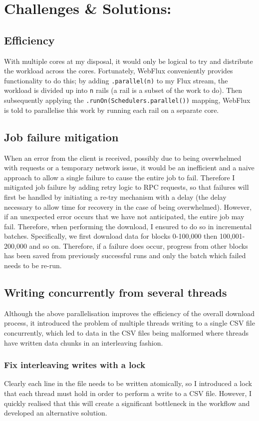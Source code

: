 \section{Challenges \& Solutions:}
\subsection{Efficiency}
With multiple cores at my disposal, it would only be logical to try and distribute the workload across the cores. Fortunately, WebFlux conveniently provides functionality to do this; by adding \texttt{.parallel(n)} to my Flux stream, the workload is divided up into \texttt{n} rails (a rail is a subset of the work to do). Then subsequently applying the \texttt{.runOn(Schedulers.parallel())} mapping, WebFlux is told to parallelise this work by running each rail on a separate core. 
\subsection{Job failure mitigation}
When an error from the client is received, possibly due to being overwhelmed with requests or a temporary network issue, it would be an inefficient and a naive approach to allow a single failure to cause the entire job to fail. Therefore I mitigated job failure by adding retry logic to RPC requests, so that failures will first be handled by initiating a re-try mechanism with a delay (the delay necessary to allow time for recovery in the case of being overwhelmed). However, if an unexpected error occurs that we have not anticipated, the entire job may fail. Therefore, when performing the download, I ensured to do so in incremental batches. Specifically, we first download data for blocks 0-100,000 then 100,001-200,000 and so on. Therefore, if a failure does occur, progress from other blocks has been saved from previously successful runs and only the batch which failed needs to be re-run. 

\subsection{Writing concurrently from several threads}
Although the above parallelisation improves the efficiency of the overall download process, it introduced the problem of multiple threads writing to a single CSV file concurrently, which led to data in the CSV files being malformed where threads have written data chunks in an interleaving fashion. 

\subsubsection{Fix interleaving writes with a lock} 
Clearly each line in the file needs to be written atomically, so I introduced a lock that each thread must hold in order to perform a write to a CSV file. However, I quickly realised that this will create a significant bottleneck in the workflow and developed an alternative solution.

